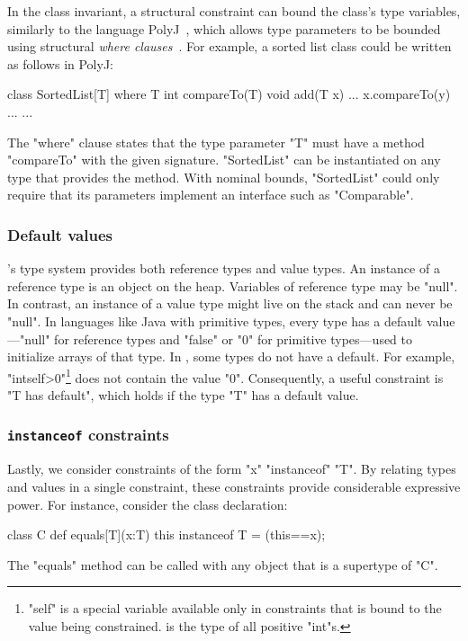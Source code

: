 In the class invariant, a structural constraint can bound the
class's type variables, similarly to 
the language PolyJ~\cite{java-popl97}, which allows type
parameters to be
bounded using
structural \emph{where clauses}~\cite{where-clauses}.
For example, a sorted list class
could be written as follows in PolyJ:
{
\begin{xtennoindent}
class SortedList[T] where T {int compareTo(T)} {
  void add(T x) {... x.compareTo(y) ...}
  ...
}
\end{xtennoindent}}
The \xcd"where" clause states that the type parameter
\xcd"T" must have a
method \xcd"compareTo" with the given signature.
\xcd"SortedList" can be instantiated on any type
that provides the method.
With nominal bounds, \xcd"SortedList" could only require that
its parameters implement an interface such as \xcd"Comparable".

\subsubsection{Default values}

\Xten's type system provides both reference types and value
types.  An instance of a reference type is an object on the
heap.  Variables of reference type may be \xcd"null".
In contrast, an instance of a value type might live on the stack
and can never be \xcd"null".  In languages like Java with
primitive types, every type has a default value---\xcd"null" for
reference types and \xcd"false" or \xcd"0" for primitive
types---used to initialize arrays of that type.
In \Xten, some types do not have a default.  For example,
\xcd"int{self>0}"\footnote{\xcd"self" is a special variable
available only in constraints that is bound to the value being
constrained.   is the type of all positive
\xcd"int"s.} does not contain the value \xcd"0".
Consequently, a useful constraint is \xcd"T has default", which
holds if the type \xcd"T" has a default value.

\subsubsection{{\tt instanceof} constraints}

Lastly, we consider constraints of the form \xcd"x" \xcd"instanceof" \xcd"T".
By relating types and values in a single constraint, 
these constraints provide considerable expressive power.
For instance, 
consider the class declaration:
\begin{xtennoindent}
class C {
  def equals[T](x:T) {this instanceof T} = (this==x);
}
\end{xtennoindent}
The \xcd"equals" method can be called with any object
that is a supertype of \xcd"C".

